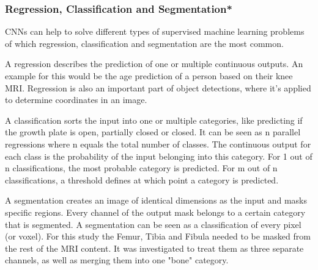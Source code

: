 \subsubsection{Regression, Classification and Segmentation*}

CNNs can help to solve different types of supervised machine learning problems of which regression, classification and segmentation are the most common.

A regression describes the prediction of one or multiple continuous outputs. An example for this would be the age prediction of a person based on their knee MRI. Regression is also an important part of object detections, where it's applied to determine coordinates in an image.

A classification sorts the input into one or multiple categories, like predicting if the growth plate is open, partially closed or closed. It can be seen as n parallel regressions where n equals the total number of classes. The continuous output for each class is the probability of the input belonging into this category. For 1 out of n classifications, the most probable category is predicted. For m out of n classifications, a threshold defines at which point a category is predicted.

A segmentation creates an image of identical dimensions as the input and masks specific regions. Every channel of the output mask belongs to a certain category that is segmented. A segmentation can be seen as a classification of every pixel (or voxel). For this study the Femur, Tibia and Fibula needed to be masked from the rest of the MRI content. It was investigated to treat them as three separate channels, as well as merging them into one "bone" category.

\newpage